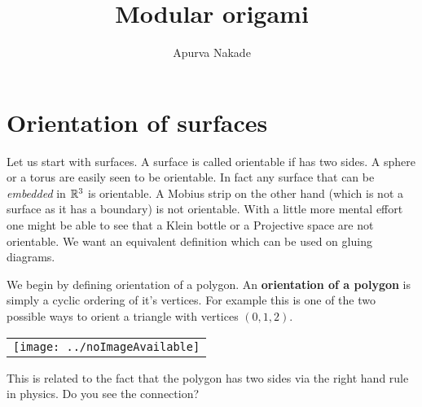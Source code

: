 \iffalse
It's unfair to say that mathematicians aren't real doctors, we perform surgeries all the time. In this class we'll introduce the notion of a topological manifold via simplicial (delta) complexes. Spend a day or two doing examples and go over several notions like orientation, cobordism and of course surgery.

Keywords: simplicial complex, manifold, orientation, cobordism, surgery

Type: Lecture
Homework: Recommended
Prereqs: None
\fi





\title{Modular origami}
\author{Apurva Nakade}
\thispagestyle{fancy}
\maketitle


\section{Orientation of surfaces}
Let us start with surfaces. A surface is called orientable if has two sides. A sphere or a torus are easily seen to be orientable. In fact any surface that can be \textit{embedded} in $\mathbb{R}^3$ is orientable. A Mobius strip on the other hand (which is not a surface as it has a boundary) is not orientable. With a little more mental effort one might be able to see that a Klein bottle or a Projective space are not orientable. We want an equivalent definition which can be used on gluing diagrams.

We begin by defining orientation of a polygon. An \textbf{orientation of a polygon} is simply a cyclic ordering of it's vertices. For example this is one of the two possible ways to orient a triangle with vertices $(0,1,2)$.

\begin{center}
	\begin{tabular}{c}
		\centering \texttt{[image: ../noImageAvailable]}
	\end{tabular}
\end{center}

\begin{exercise}
	This is related to the fact that the polygon has two sides via the right hand rule in physics. Do you see the connection?
\end{exercise}

